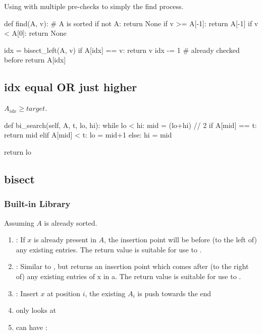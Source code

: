 Using  with multiple pre-checks to simply the find process.
\begin{python}
def find(A, v):
  # A is sorted 
  if not A:
    return None
  if v >= A[-1]:
    return A[-1]
  if v < A[0]:
    return None
    
  idx = bisect_left(A, v)
  if A[idx] == v:
    return v
  idx -= 1  # already checked before
  return A[idx]
\end{python}

\subsection{idx equal OR just higher}
$A_{idx} \geq target$.
\begin{python}
def bi_search(self, A, t, lo, hi):
    while lo < hi:
        mid = (lo+hi) // 2
        if A[mid] == t:
            return mid
        elif A[mid] < t:
            lo = mid+1
        else:
            hi = mid
        
    return lo
\end{python}
\subsection{bisect}
\subsubsection{Built-in Library}
Assuming $A$ is already sorted. 
\begin{enumerate}
\item {}: If $x$ is already present in $A$, the insertion point will be before (to the left of) any existing entries. The return value is suitable for use to .
\item {}: Similar to , but returns an insertion point which comes after (to the right of) any existing entries of x in a. The return value is suitable for use to .
\item {}: Insert $x$ at position $i$, the existing $A_i$ is push towards the end
\item {} only looks at 
\item {} can have : 
\end{enumerate}

